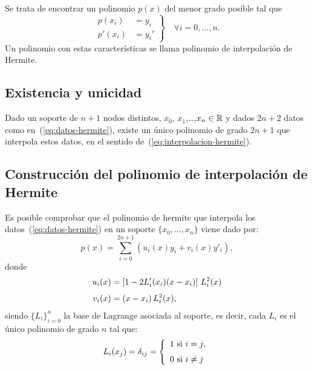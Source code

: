 Se trata de encontrar un polinomio $p(x)$ del menor grado posible tal
que
\begin{equation}
  \left.
    \begin{aligned}
      p(x_i) &= y_i \\ p'(x_i)&=y_i'
    \end{aligned}
  \right\}\quad \forall i=0,\dots,n.
  \label{eq:interpolacion-hermite}
\end{equation}
Un polinomio con estas características se llama polinomio de
interpolación de Hermite.

\subsection{Existencia y unicidad}
\label{sec:exist-y-unic}

\begin{theorem}
  Dado un soporte de $n+1$ nodos distintos, $x_0$,
  $x_1$,\dots,$x_n\in\operatorname{{\mathbb R}}$ y dados $2n+2$ datos como
  en~(\ref{eq:datos-hermite}), existe un único polinomio de grado
  $2n+1$ que interpola estos datos, en el sentido
  de~(\ref{eq:interpolacion-hermite}).
\end{theorem}

\subsection*{Construcción del polinomio de interpolación de Hermite}
\label{sec:constr-del-polin-hermite}

Es posible comprobar que el polinomio de hermite que interpola los
datos~(\ref{eq:datos-hermite}) en un soporte $\{x_0,\dots,x_n\}$
viene dado por:
\begin{equation*}
  p(x)=\sum_{i=0}^{2n+1}(u_i(x)y_i+ v_i(x)y'_i),
\end{equation*}
donde
\begin{align*}
  u_i(x)&=\left[1-2L'_i(x_i)(x-x_i)\right]\, L_i^2(x)
  \\ \noalign{\smallskip}
  v_i(x)&=(x-x_i)\, L_i^2(x),
\end{align*}
siendo $\{L_i\}_{i=0}^n$ la base de Lagrange asociada al soporte,
es decir, cada $L_i$ es el único polinomio de grado $n$ tal que:
\begin{equation}
  L_i(x_j)= \delta_{ij} =
  \left\{\begin{array}{l}
           1 \text{ si } i=j, \\\noalign{\medskip} 0 \text{ si } i\neq j
         \end{array}\right.
     \end{equation}

